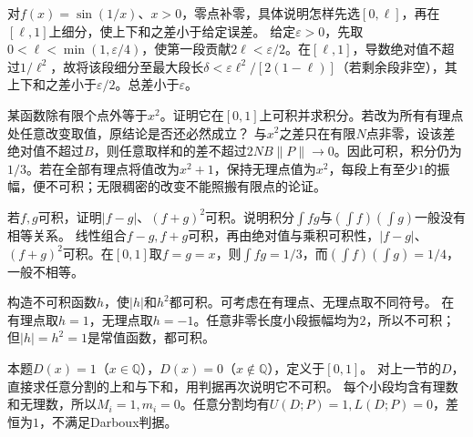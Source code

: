 对\(f(x)=\sin(1/x)\)、\(x>0\)，零点补零，具体说明怎样先选\([0,\ell]\)，再在\([\ell,1]\)上细分，使上下和之差小于给定误差。
\solutionanswer
给定\(\varepsilon>0\)，先取\(0<\ell<\min(1,\varepsilon/4)\)，使第一段贡献\(2\ell<\varepsilon/2\)。在\([\ell,1]\)，导数绝对值不超过\(1/\ell^2\)，故将该段细分至最大段长\(\delta<\varepsilon\ell^2/[2(1-\ell)]\)（若剩余段非空），其上下和之差小于\(\varepsilon/2\)。总差小于\(\varepsilon\)。


某函数除有限个点外等于\(x^2\)。证明它在\([0,1]\)上可积并求积分。若改为所有有理点处任意改变取值，原结论是否还必然成立？
\solutionanswer
与\(x^2\)之差只在有限\(N\)点非零，设该差绝对值不超过\(B\)，则任意取样和的差不超过\(2NB\|P\|\to0\)。因此可积，积分仍为\(1/3\)。若在全部有理点将值改为\(x^2+1\)，保持无理点值为\(x^2\)，每段上有至少\(1\)的振幅，便不可积；无限稠密的改变不能照搬有限点的论证。


若\(f,g\)可积，证明\(|f-g|\)、\((f+g)^2\)可积。说明积分\(\int fg\)与\((\int f)(\int g)\)一般没有相等关系。
\solutionanswer
线性组合\(f-g,f+g\)可积，再由绝对值与乘积可积性，\(|f-g|\)、\((f+g)^2\)可积。在\([0,1]\)取\(f=g=x\)，则\(\int fg=1/3\)，而\((\int f)(\int g)=1/4\)，一般不相等。


构造不可积函数\(h\)，使\(|h|\)和\(h^2\)都可积。可考虑在有理点、无理点取不同符号。
\solutionanswer
在有理点取\(h=1\)，无理点取\(h=-1\)。任意非零长度小段振幅均为\(2\)，所以不可积；但\(|h|=h^2=1\)是常值函数，都可积。


本题\(D(x)=1\)（\(x\in\mathbb Q\)），\(D(x)=0\)（\(x\notin\mathbb Q\)），定义于\([0,1]\)。
对上一节的\(D\)，直接求任意分割的上和与下和，用判据再次说明它不可积。
\solutionanswer
每个小段均含有理数和无理数，所以\(M_i=1,m_i=0\)。任意分割均有\(U(D;P)=1,L(D;P)=0\)，差恒为\(1\)，不满足Darboux判据。
\par
